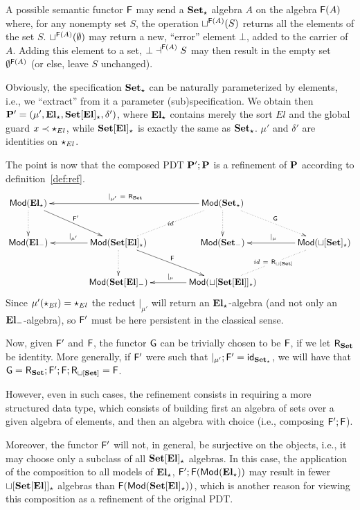 \begin{example}
A possible semantic functor $\fu F$ may send a $\thr{Set}_\cons$ algebra $A$ on the
algebra $\fu F(A)$ where, for any nonempty set $S$, the operation 
$\choice^{\fu F(A)}(S)$ returns all the elements of the set
$S$. $\choice^{\fu F(A)}(\emptyset)$ may return a new, ``error'' element $\bot$,
added to the carrier of $A$. Adding this element to a set, $\bot\prep^{\fu F(A)}S$ may then result in
the empty set $\emptyset^{\fu F(A)}$ (or else, leave $S$ unchanged).

Obviously, the specification $\thr{Set_\cons}$ can be naturally parameterized
by elements, i.e., we ``extract'' from it a parameter (sub)specification. We
obtain then $\thr P'=\pdtsp{\mu'}{\delta'}{\thr{El}_\cons}{\thr{Set[El]_\cons}}$,
where $\thr{El_\cons}$ contains merely the sort $El$ and the global guard
$x\prec \cons_{El}$, while $\thr{Set[El]_\cons}$ is exactly the same as
$\thr{Set_\cons}$. $\mu'$ and $\delta'$ are identities on $\cons_{El}$. 

The point is now that the composed PDT $\thr P';\thr P$ is a refinement of
$\thr P$ according to definition~\ref{def:ref}. 
\[\xymatrix@C=0.6cm@R=1cm{
\Mod(\thr{El_\cons}) \ar[drr]^{\fu F'} \ar@{.>}[d] && &&
  \Mod(\thr{Set_\cons})  \ar@{.>}[d]
    \ar[llll]_{|_{\mu'}\ =\ \reff{Set}}  \ar@{.>}[drr]^{\fu G} \ar@{.}[dll]|{id} \\
\Mod(\thr{El_\weak}) && \Mod(\thr{Set[El]_\cons})  \ar@{.>}[d] \ar[drr]^{\fu F} \ar[ll]_{|_{\mu'}}
   && \Mod(\thr{Set_\weak}) && \Mod(\thr{\choice[Set]_\cons})
   \ar@{.}[dll]|{id\ =\ \reff{\choice[Set]}} \ar[ll]_{|_{\mu}}\\ 
&& \Mod(\thr{Set[El]_\weak}) && \Mod(\thr{\choice[Set[El]]_\cons}) \ar[ll]_{|_{\mu}}
}
\]
Since $\mu'(\cons_{El})=\cons_{El}$ the  reduct $|_{\mu'}$ will
return an $\thr{El_\cons}$-algebra (and not only an
$\thr{El_\weak}$-algebra), so $\fu F'$ must be here persistent in the
classical sense.

Now, given $\fu F'$ and $\fu F$, the functor $\fu G$ can be trivially chosen
to be $\fu F$, if we let $\reff{Set}$ be identity. More generally, if $\fu F'$ were such that $|_{\mu'};\fu
F'=\fu{id}_{\thr{Set_{\cons}}}$, we will have that $\fu G=\reff{Set};\fu
F';\fu F;\reff{\choice[Set]}=\fu F$. 

However, even in such cases, the refinement consists in requiring a more
structured data type, which consists of building first an algebra of sets
over a given algebra of elements, and then an algebra with choice (i.e., 
composing $\fu F';\fu F$). 

 Moreover, the functor $\fu F'$ will not, in general, be surjective on the
 objects, i.e., it may choose only a subclass of all $\thr{Set[El]_\cons}$
 algebras. In this case, the application of the composition to all models of
 $\thr{El_\cons}$, $\fu F';\fu F(\Mod(\thr{El_\cons}))$ may result in fewer
 $\thr{\choice[Set[El]]_\cons}$ algebras than $\fu F(\Mod(\thr{Set[El]_\cons}))$,
 which is another reason for viewing this composition as a refinement of the
 original PDT.
\end{example}

